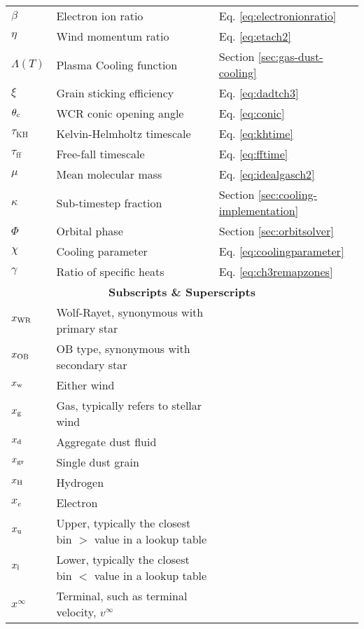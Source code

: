 \begin{Common_Symbols}
\begin{longtable}[c]{lll}

  $\beta$ & Electron ion ratio & Eq. \ref{eq:electronionratio} \\
  $\eta$ & Wind momentum ratio  & Eq. \ref{eq:etach2} \\
  
  $\Lambda(T)$ & Plasma Cooling function & Section \ref{sec:gas-dust-cooling} \\

  $\xi$ & Grain sticking efficiency & Eq. \ref{eq:dadtch3} \\

  $\theta_\text{c}$ & WCR conic opening angle & Eq. \ref{eq:conic} \\
  
  $\tau_\text{KH}$ & Kelvin-Helmholtz timescale & Eq. \ref{eq:khtime} \\
  $\tau_\text{ff}$ & Free-fall timescale & Eq. \ref{eq:fftime} \\

  $\mu$ & Mean molecular mass & Eq. \ref{eq:idealgasch2} \\

  $\kappa$ & Sub-timestep fraction & Section \ref{sec:cooling-implementation} \\

  $\Phi$ & Orbital phase & Section \ref{sec:orbitsolver} \\

  $\chi$ & Cooling parameter  & Eq. \ref{eq:coolingparameter} \\

  $\gamma$ & Ratio of specific heats & Eq. \ref{eq:ch3remapzones} \\

  \hline
  \multicolumn{3}{c}{\textbf{Subscripts \& Superscripts}} \\
  \hline

  $x_\text{WR}$   & Wolf-Rayet, synonymous with primary star & \\
  $x_\text{OB}$   & OB type, synonymous with secondary star & \\
  $x_\text{w}$    & Either wind & \\
  $x_\text{g}$    & Gas, typically refers to stellar wind & \\
  $x_\text{d}$    & Aggregate dust fluid & \\
  $x_\text{gr}$   & Single dust grain & \\
  $x_\text{H}$    & Hydrogen & \\
  $x_e$         & Electron & \\
  $x_\text{u}$    & Upper, typically the closest bin $>$ value in a lookup table & \\
  $x_\text{l}$    & Lower, typically the closest bin $<$ value in a lookup table & \\
  $x^\infty$    & Terminal, such as terminal velocity, $v^\infty$ & \\


\end{longtable}
\end{Common_Symbols}
